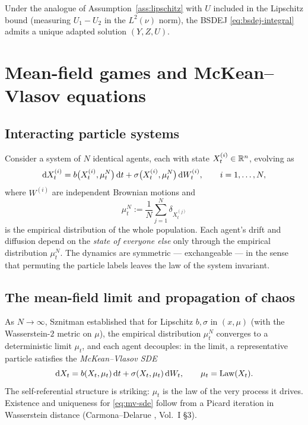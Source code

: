 \begin{theorem}
\label{thm:bsdej-well-posed}
Under the analogue of Assumption~\ref{ass:lipschitz} with $U$ included in the Lipschitz bound (measuring $U_1 - U_2$ in the $L^2(\nu)$ norm), the BSDEJ \eqref{eq:bsdej-integral} admits a unique adapted solution $(Y, Z, U)$.
\end{theorem}

\section{Mean-field games and McKean--Vlasov equations}
\label{sec:mfg}

\subsection{Interacting particle systems}

Consider a system of $N$ identical agents, each with state $X^{(i)}_t \in \mathbb{R}^n$, evolving as
\begin{equation}
  \mathrm{d} X^{(i)}_t = b\bigl(X^{(i)}_t, \mu^N_t\bigr) \, \mathrm{d} t + \sigma\bigl(X^{(i)}_t, \mu^N_t\bigr) \, \mathrm{d} W^{(i)}_t, \qquad i = 1, \ldots, N,
  \label{eq:ips}
\end{equation}
where $W^{(i)}$ are independent Brownian motions and
\begin{equation}
  \mu^N_t := \frac{1}{N} \sum_{j=1}^N \delta_{X^{(j)}_t}
\end{equation}
is the empirical distribution of the whole population. Each agent's drift and diffusion depend on the \emph{state of everyone else} only through the empirical distribution $\mu^N_t$. The dynamics are symmetric --- exchangeable --- in the sense that permuting the particle labels leaves the law of the system invariant.

\subsection{The mean-field limit and propagation of chaos}

As $N \to \infty$, Sznitman \cite{sznitman1991} established that for Lipschitz $b, \sigma$ in $(x, \mu)$ (with the Wasserstein-$2$ metric on $\mu$), the empirical distribution $\mu^N_t$ converges to a deterministic limit $\mu_t$, and each agent decouples: in the limit, a representative particle satisfies the \emph{McKean--Vlasov SDE}
\begin{equation}
  \mathrm{d} X_t = b(X_t, \mu_t) \, \mathrm{d} t + \sigma(X_t, \mu_t) \, \mathrm{d} W_t, \qquad \mu_t = \mathrm{Law}(X_t).
  \label{eq:mv-sde}
\end{equation}
The self-referential structure is striking: $\mu_t$ is the law of the very process it drives. Existence and uniqueness for \eqref{eq:mv-sde} follow from a Picard iteration in Wasserstein distance (Carmona--Delarue \cite{carmona2018}, Vol.~I \S3).

